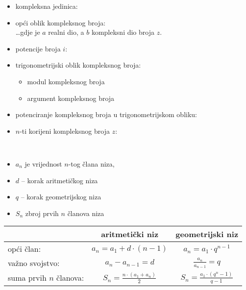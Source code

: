 \documentclass[10pt,oneside,a4paper]{report}
\begin{document}
\begin{itemize}
\item kompleksna jedinica: \hspace{1cm} 
\item op\'{c}i oblik kompleksnog broja: \hspace{1cm} \\ \dots gdje je $a$ realni dio, a $b$ kompleksni dio broja $z$.
\item potencije broja $i$:
\hspace{0.5cm}
\hspace{1cm}
\hspace{1cm}
\hspace{1cm}
\item trigonometrijski oblik kompleksnog broja: \hspace{1cm}
\begin{itemize}
\item modul kompleksnog broja \hspace{1cm}
\item argument kompleksnog broja  \hspace{1cm}
\end{itemize} 
\item potenciranje kompleksnog broja u trigonometrijskom obliku: \hspace{1cm}
\item $n$-ti korijeni kompleksnog broja $z$: 
\hspace{0.3cm}
\end{itemize}

\noindent
{}\\
\begin{itemize}
\item $a_n$ je vrijednost $n$-tog \v{c}lana niza,
\item $d$ -- korak aritmeti\v{c}kog niza
\item $q$ -- korak geometrijskog niza
\item $S_n$ zbroj prvih $n$ \v{c}lanova niza
\end{itemize}
\hspace*{2cm}
\begin{tabular}{l|c|c}
& {\large aritmeti\v{c}ki niz} & {\large geometrijski niz}\\
\hline
op\'{c}i \v{c}lan: & $a_n=a_1+d\cdot (n-1)$ & $a_n=a_1\cdot q^{n-1}$\\
\hline
va\v{z}no svojstvo: & $a_n-a_{n-1}=d$ & $\frac{a_n}{a_{n-1}}=q$ \\
\hline
suma prvih $n$ \v{c}lanova: & $S_n=\frac{n\cdot (a_1+a_n)}2 $ &
$S_n=\frac{a_1\cdot (q^n-1)}{q-1}$ \\
\end{tabular}
\end{document}
